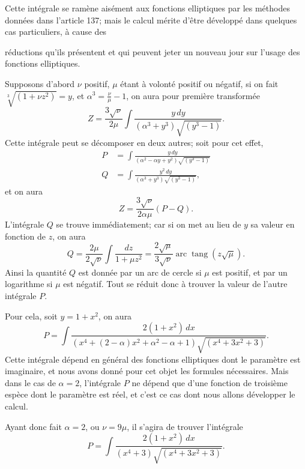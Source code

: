 \documentclass{article}
\begin{document}
Cette intégrale se ramène aisément aux fonctions elliptiques par les méthodes données dans l'article 137; mais le calcul mérite d'être développé dans quelques cas particuliers, à cause des

réductions qu'ils présentent et qui peuvent jeter un nouveau jour sur l'usage des fonctions elliptiques.

Supposons d'abord $\nu$ positif, $\mu$ étant à volonté positif ou négatif, si on fait $\sqrt[3]{(1+\nu z^{2})}=y$, et $\alpha^{3}=\frac{\nu}{\mu}-1$, on aura pour première transformée
\[ Z=\frac{3\sqrt{\nu}}{2\mu}\int\frac{y\,dy}{(\alpha^{3}+y^{3})\sqrt{(y^{3}-1)}}. \]
Cette intégrale peut se décomposer en deux autres; soit pour cet effet,
\[ \begin{aligned} P&=\int\frac{y\,dy}{(\alpha^{2}-\alpha y+y^{2})\sqrt{(y^{3}-1)}}\\ Q&=\int\frac{y^{2}\,dy}{(\alpha^{3}+y^{3})\sqrt{(y^{3}-1)}}, \end{aligned} \]
et on aura
\[ Z=\frac{3\sqrt{\nu}}{2\alpha\mu}(P-Q). \]
L'intégrale $Q$ se trouve immédiatement; car si on met au lieu de $y$ sa valeur en fonction de $z$, on aura
\[ Q=\frac{2\mu}{2\sqrt{\nu}}\int\frac{dz}{1+\mu z^{2}}=\frac{2\sqrt{\mu}}{3\sqrt{\nu}}\operatorname{arc}\operatorname{tang}(z\sqrt{\mu}). \]
Ainsi la quantité $Q$ est donnée par un arc de cercle si $\mu$ est positif, et par un logarithme si $\mu$ est négatif. Tout se réduit donc à trouver la valeur de l'autre intégrale $P$.

Pour cela, soit $y=1+x^{2}$, on aura
\[ P=\int\frac{2(1+x^{2})\,dx}{(x^{4}+(2-\alpha)x^{2}+\alpha^{2}-\alpha+1)\sqrt{(x^{4}+3x^{2}+3)}}. \]
Cette intégrale dépend en général des fonctions elliptiques dont le paramètre est imaginaire, et nous avons donné pour cet objet les formules nécessaires. Mais dans le cas de $\alpha=2$, l'intégrale $P$ ne dépend que d'une fonction de troisième espèce dont le paramètre est réel, et c'est ce cas dont nous allons développer le calcul.

Ayant donc fait $\alpha=2$, ou $\nu=9\mu$, il s'agira de trouver l'intégrale
\[ P=\int\frac{2(1+x^{2})\,dx}{(x^{4}+3)\sqrt{(x^{4}+3x^{2}+3)}}. \]
\end{document}
